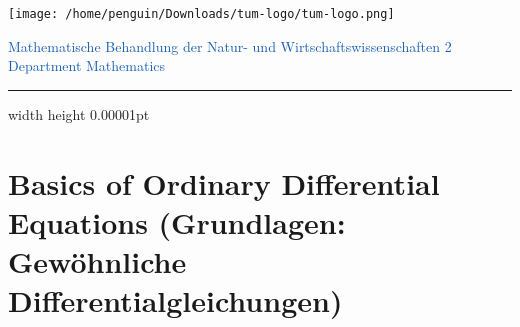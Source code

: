 \documentclass{article}
\begin{document}
\begin{flushright}
    \texttt{[image: /home/penguin/Downloads/tum-logo/tum-logo.png]} \\
\end{flushright}
\vspace{-1.7cm}
\noindent
\large 
\textcolor[HTML]{165DB1}{Mathematische Behandlung der Natur- und Wirtschaftswissenschaften 2
\\ Department Mathematics}
\vspace{5mm}
\noindent\hrule width \textwidth height 0.00001pt \relax
\normalsize
\vspace{3mm}
\section{Basics of Ordinary Differential Equations (Grundlagen: Gewöhnliche Differentialgleichungen)}
\end{document}
